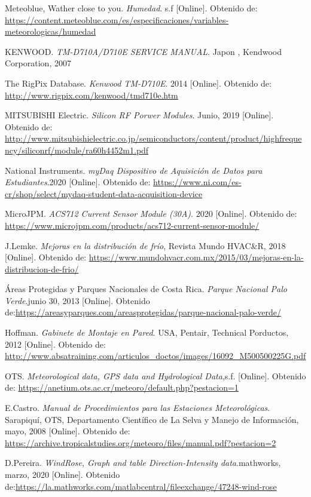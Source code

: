 \documentclass[notitlepage,oneside]{book}
\begin{document}
\begin{thebibliography}{99}
Meteoblue, Wather close to you. \emph {Humedad}. s.f [Online]. Obtenido de:\url{ https://content.meteoblue.com/es/especificaciones/variables-meteorologicas/humedad}

KENWOOD. \emph {TM-D710A/D710E SERVICE MANUAL}. Japon , Kendwood Corporation, 2007

The RigPix Database. \emph {Kenwood TM-D710E}. 2014 [Online]. Obtenido de:\url{ http://www.rigpix.com/kenwood/tmd710e.htm}

MITSUBISHI Electric. \emph {Silicon RF Porwer Modules}. Junio, 2019 [Online]. Obtenido de: \url{http://www.mitsubishielectric.co.jp/semiconductors/content/product/highfrequency/siliconrf/module/ra60h4452m1.pdf}

National Instruments. \emph {myDaq Dispositivo de Aquisición de Datos para Estudiantes}.2020 [Online]. Obtenido de: \url{https://www.ni.com/es-cr/shop/select/mydaq-student-data-acquisition-device}

MicroJPM. \emph {ACS712 Current Sensor Module (30A)}. 2020 [Online]. Obtenido de: \url{https://www.microjpm.com/products/acs712-current-sensor-module/}

J.Lemke. \emph {Mejoras en la distribución de frío}, Revista Mundo HVAC\&R, 2018 [Online]. Obtenido de: \url{https://www.mundohvacr.com.mx/2015/03/mejoras-en-la-distribucion-de-frio/}

Áreas Protegidas y Parques Nacionales de Costa Rica. \emph {Parque Nacional Palo Verde}.junio 30, 2013 [Online]. Obtenido de:\url{https://areasyparques.com/areasprotegidas/parque-nacional-palo-verde/}

Hoffman. \emph {Gabinete de Montaje en Pared}. USA, Pentair, Technical Porductos, 2012 [Online]. Obtenido de: \url{http://www.absatraining.com/articulos_doctos/images/16092_M500500225G.pdf}

OTS. \emph {Meteorological data, GPS data and Hydrological Data},s.f. [Online]. Obtenido de: \url{https://anetium.ots.ac.cr/meteoro/default.php?pestacion=1}

E.Castro. \emph {Manual de Procedimientos para las Estaciones Meteorológicas}. Sarapiquí, OTS, Departamento Científico de La Selva y Manejo de Información, mayo, 2008 [Online]. Obtenido de: \url{ https://archive.tropicalstudies.org/meteoro/files/manual.pdf?pestacion=2}

D.Pereira. \emph {WindRose, Graph and table Direction-Intensity data}.mathworks, marzo, 2020 [Online]. Obtenido de:\url{https://la.mathworks.com/matlabcentral/fileexchange/47248-wind-rose}


\end{thebibliography}
\end{document}
